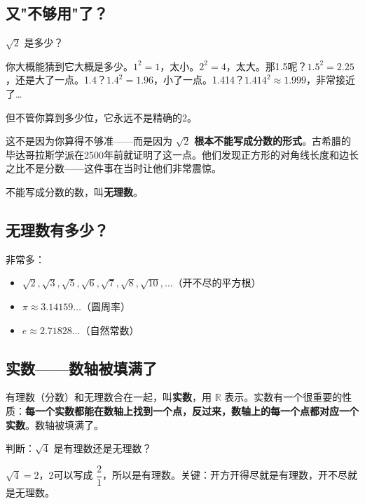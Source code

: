 
\subsection*{又"不够用"了？}

$\sqrt{2}$ 是多少？

你大概能猜到它大概是多少。$1^2=1$，太小。$2^2=4$，太大。那1.5呢？$1.5^2=2.25$，还是大了一点。1.4？$1.4^2=1.96$，小了一点。1.414？$1.414^2\approx1.999$，非常接近了\ldots

但不管你算到多少位，它永远不是精确的2。

这不是因为你算得不够准——而是因为 $\sqrt{2}$ \textbf{根本不能写成分数的形式}。古希腊的毕达哥拉斯学派在2500年前就证明了这一点。他们发现正方形的对角线长度和边长之比不是分数——这件事在当时让他们非常震惊。

不能写成分数的数，叫\textbf{无理数}。

\subsection*{无理数有多少？}

非常多：

\begin{itemize}
  \item $\sqrt{2},\sqrt{3},\sqrt{5},\sqrt{6},\sqrt{7},\sqrt{8},\sqrt{10},\ldots$（开不尽的平方根）
  \item $\pi\approx3.14159\ldots$（圆周率）
  \item $e\approx2.71828\ldots$（自然常数）
\end{itemize}

\subsection*{实数——数轴被填满了}

有理数（分数）和无理数合在一起，叫\textbf{实数}，用 $\mathbb{R}$ 表示。实数有一个很重要的性质：\textbf{每一个实数都能在数轴上找到一个点，反过来，数轴上的每一个点都对应一个实数}。数轴被填满了。

\begin{example}
判断：$\sqrt{4}$ 是有理数还是无理数？
\end{example}
\begin{solution}
$\sqrt{4}=2$，2可以写成 $\dfrac{2}{1}$，所以是有理数。关键：开方开得尽就是有理数，开不尽就是无理数。
\end{solution}

